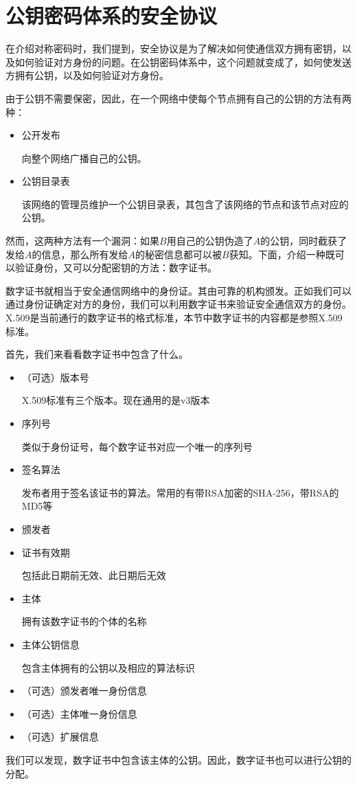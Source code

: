 \section{公钥密码体系的安全协议}
在介绍对称密码时，我们提到，安全协议是为了解决如何使通信双方拥有密钥，以及如何验证对方身份的问题。在公钥密码体系中，这个问题就变成了，如何使发送方拥有公钥，以及如何验证对方身份。\par
由于公钥不需要保密，因此，在一个网络中使每个节点拥有自己的公钥的方法有两种：
\begin{itemize}
    \item 公开发布\par
    向整个网络广播自己的公钥。
    \item 公钥目录表\par
    该网络的管理员维护一个公钥目录表，其包含了该网络的节点和该节点对应的公钥。
\end{itemize}

然而，这两种方法有一个漏洞：如果$B$用自己的公钥伪造了$A$的公钥，同时截获了发给$A$的信息，那么所有发给$A$的秘密信息都可以被$B$获知。下面，介绍一种既可以验证身份，又可以分配密钥的方法：数字证书。\par
数字证书就相当于安全通信网络中的身份证。其由可靠的机构颁发。正如我们可以通过身份证确定对方的身份，我们可以利用数字证书来验证安全通信双方的身份。X.509是当前通行的数字证书的格式标准，本节中数字证书的内容都是参照X.509标准。\par
首先，我们来看看数字证书中包含了什么。
\begin{itemize}
	\item （可选）版本号\par
	X.509标准有三个版本。现在通用的是v3版本
	\item 序列号\par
	类似于身份证号，每个数字证书对应一个唯一的序列号
	\item 签名算法\par
	发布者用于签名该证书的算法。常用的有带RSA加密的SHA-256，带RSA的MD5等
	\item 颁发者
	\item 证书有效期\par
	包括此日期前无效、此日期后无效
	\item 主体\par
	拥有该数字证书的个体的名称
	\item 主体公钥信息\par
	包含主体拥有的公钥以及相应的算法标识
	\item （可选）颁发者唯一身份信息
	\item （可选）主体唯一身份信息
	\item （可选）扩展信息
\end{itemize}

我们可以发现，数字证书中包含该主体的公钥。因此，数字证书也可以进行公钥的分配。
